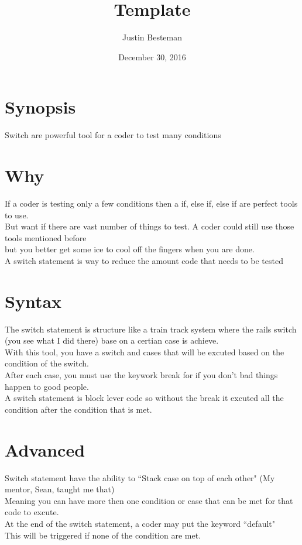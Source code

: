 \documentclass[12pt, letterpaper]{article}
\title{Template }
\author{Justin Besteman}
\date{December 30, 2016}
\begin{document}
\maketitle


\section*{Synopsis}

Switch are powerful tool for a coder to test many conditions

\section*{Why}

If a coder is testing only a few conditions then a if, else if, else if are perfect tools to use. \\
But want if there are vast number of things to test. A coder could still use those tools mentioned before \\
but you better get some ice to cool off the fingers when you are done.\\
A switch statement is way to reduce the amount code that needs to be tested

\section*{Syntax}

The switch statement is structure like a train track system where the rails switch (you see what I did there) base on a certian case is achieve. \\
With this tool, you have a switch and cases that will be excuted based on the condition of the switch. \\
After each case, you must use the keywork break for if you don't bad things happen to good people.\\
A switch statement is block lever code so without the break it excuted all the condition after the condition that is met.

\section*{Advanced}

Switch statement have the ability to ``Stack case on top of each other" (My mentor, Sean, taught me that) \\
Meaning you can have more then one condition or case that can be met for that code to excute. \\
At the end of the switch statement, a coder may put the keyword ``default" \\
This will be triggered if none of the condition are met. 
\end{document}

